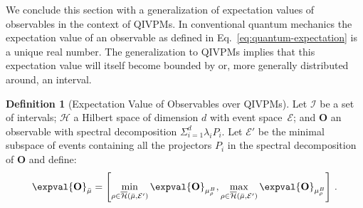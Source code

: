 \documentclass[english,reprint, aps, prl,superscriptaddress, showpacs,
showkeys, longbibliography, amsmath, amssymb, floatfix]{revtex4-1}
\theoremstyle{plain}
\theoremstyle{definition}
\newtheorem{definition}{Definition}
\newcommand{\Hilb}{\mathcal{H}}
\newcommand{\events}{\ensuremath{\mathcal{E}}}
\newcommand{\coreBorn}{\ensuremath{\overline{\Hilb}}}
\newcommand{\muB}{\ensuremath{\mu^{B}}}
\begin{document}
We conclude this section with a generalization of expectation values
of observables in the context of QIVPMs. In conventional quantum
mechanics the expectation value of an observable as defined in
Eq.~\eqref{eq:quantum-expectation} is a unique real number. The
generalization to QIVPMs implies that this expectation value will
itself become bounded by or, more generally distributed around, an interval. 

\begin{definition}[Expectation Value of Observables over QIVPMs] Let
  $\mathscr{I}$ be a set of intervals; $\Hilb$ a Hilbert space of
  dimension $d$ with event space~$\events$; and $\mathbf{O}$ an
  observable with spectral decomposition
  $\Sigma_{i=1}^d \lambda_iP_i$. Let $\events'$ be the minimal
  subspace of events containing all the projectors $P_i$ in the
  spectral decomposition of $\mathbf{O}$ and define:
\begin{equation}
\expval{\mathbf{O}}_{\bar{\mu}}=\left[\min_{\rho\in\coreBorn\left(\bar{\mu},\events'\right)}
\expval{\mathbf{O}}_{\muB_{\rho}},\max_{\rho\in\coreBorn\left(\bar{\mu},\events'\right)}
\expval{\mathbf{O}}_{\muB_{\rho}}\right]\,. \label{eq:quantum-interval-expectation-core}
\end{equation}
\end{definition}
\end{document}
